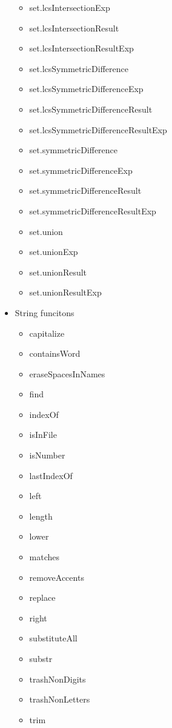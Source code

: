 \begin{itemize}
\begin{itemize}
        \item set.lcsIntersectionExp
        \item set.lcsIntersectionResult
        \item set.lcsIntersectionResultExp
        \item set.lcsSymmetricDifference
        \item set.lcsSymmetricDifferenceExp
        \item set.lcsSymmetricDifferenceResult
        \item set.lcsSymmetricDifferenceResultExp
        \item set.symmetricDifference
        \item set.symmetricDifferenceExp
        \item set.symmetricDifferenceResult
        \item set.symmetricDifferenceResultExp
        \item set.union
        \item set.unionExp
        \item set.unionResult
        \item set.unionResultExp
    \end{itemize}
    \item String funcitons
    \begin{itemize}
        \item capitalize
        \item containsWord
        \item eraseSpacesInNames
        \item find
        \item indexOf
        \item isInFile
        \item isNumber
        \item lastIndexOf
        \item left
        \item length
        \item lower
        \item matches
        \item removeAccents
        \item replace
        \item right
        \item substituteAll
        \item substr
        \item trashNonDigits
        \item trashNonLetters
        \item trim

\end{itemize}
\end{itemize}
